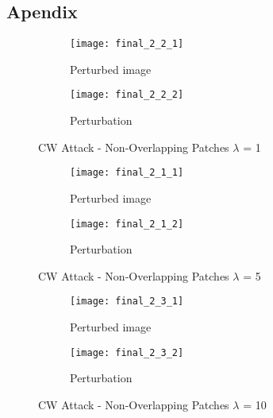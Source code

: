 \documentclass[11pt]{article}
\begin{document}
\newpage
\subsection*{Apendix}

\begin{figure}[H]
\begin{subfigure}{.5\textwidth}
  \centering
  \texttt{[image: final\_2\_2\_1]}
  \caption{Perturbed image}
  \label{fig:}
\end{subfigure}
\begin{subfigure}{.5\textwidth}
  \centering
  \texttt{[image: final\_2\_2\_2]}
  \caption{Perturbation}
  \label{fig:}
\end{subfigure}



\caption{CW Attack - Non-Overlapping Patches $\lambda$ = 1}
\label{fig:}
\end{figure}

\begin{figure}[H]
\begin{subfigure}{.5\textwidth}
  \centering
  \texttt{[image: final\_2\_1\_1]}
  \caption{Perturbed image}
  \label{fig:}
\end{subfigure}
\begin{subfigure}{.5\textwidth}
  \centering
  \texttt{[image: final\_2\_1\_2]}
  \caption{Perturbation}
  \label{fig:}
\end{subfigure}

\caption{CW Attack - Non-Overlapping Patches $\lambda$ = 5}
\label{fig:}
\end{figure}

\begin{figure}[H]
\begin{subfigure}{.5\textwidth}
  \centering
  \texttt{[image: final\_2\_3\_1]}
  \caption{Perturbed image}
  \label{fig:}
\end{subfigure}
\begin{subfigure}{.5\textwidth}
  \centering
  \texttt{[image: final\_2\_3\_2]}
  \caption{Perturbation}
  \label{fig:}
\end{subfigure}


\caption{CW Attack - Non-Overlapping Patches $\lambda$ = 10}
\label{fig:}
\end{figure}
\end{document}
